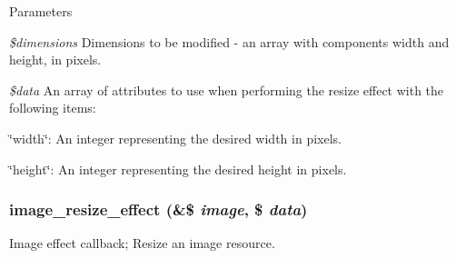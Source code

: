 \begin{DoxyParams}{Parameters}
\item[{\em \$dimensions}]Dimensions to be modified -\/ an array with components width and height, in pixels. \item[{\em \$data}]An array of attributes to use when performing the resize effect with the following items:
\begin{DoxyItemize}
\item \char`\"{}width\char`\"{}: An integer representing the desired width in pixels.
\item \char`\"{}height\char`\"{}: An integer representing the desired height in pixels. 
\end{DoxyItemize}\end{DoxyParams}
\hypertarget{image_8effects_8inc_a51bdcc43e0a3213fa4255254583e0cc8}{
\subsubsection[{image\_\-resize\_\-effect}]{\setlength{\rightskip}{0pt plus 5cm}image\_\-resize\_\-effect (\&\$ {\em image}, \/  \$ {\em data})}}
\label{image_8effects_8inc_a51bdcc43e0a3213fa4255254583e0cc8}
Image effect callback; Resize an image resource.


